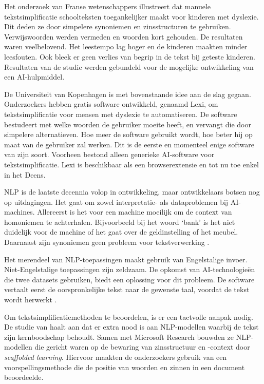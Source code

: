 Het onderzoek van Franse wetenschappers \textcite{Gala2016} illustreert dat manuele tekstsimplificatie schoolteksten toegankelijker maakt voor kinderen met dyslexie. Dit deden ze door simpelere synoniemen en zinsstructuren te gebruiken. Verwijswoorden werden vermeden en woorden kort gehouden. De resultaten waren veelbelovend. Het leestempo lag hoger en de kinderen maakten minder leesfouten. Ook bleek er geen verlies van begrip in de tekst bij geteste kinderen. Resultaten van de studie werden gebundeld voor de mogelijke ontwikkeling van een AI-hulpmiddel.

De Universiteit van Kopenhagen is met bovenstaande idee aan de slag gegaan. Onderzoekers \textcite{Bingel2018} hebben gratis software ontwikkeld, genaamd Lexi, om tekstsimplificatie voor mensen met dyslexie te automatiseren. De software bestudeert met welke woorden de gebruiker moeite heeft, en vervangt die door simpelere alternatieven. Hoe meer de software gebruikt wordt, hoe beter hij op maat van de gebruiker zal werken. Dit is de eerste en momenteel enige software van zijn soort. Voorheen bestond alleen generieke AI-software voor tekstsimplificatie. Lexi is beschikbaar als een browserextensie en tot nu toe enkel in het Deens. 

NLP is de laatste decennia volop in ontwikkeling, maar ontwikkelaars botsen nog op uitdagingen. Het gaat om zowel interpretatie- als dataproblemen bij AI-machines. Allereerst is het voor een machine moeilijk om de context van homoniemen te achterhalen. Bijvoorbeeld bij het woord ‘bank’ is het niet duidelijk voor de machine of het gaat over de geldinstelling of het meubel. Daarnaast zijn synoniemen geen probleem voor tekstverwerking \autocite{Roldos2020}.

Het merendeel van NLP-toepassingen maakt gebruik van Engelstalige invoer. Niet-Engelstalige toepassingen zijn zeldzaam. De opkomst van AI-technologieën die twee datasets gebruiken, biedt een oplossing voor dit probleem. De software vertaalt eerst de oorspronkelijke tekst naar de gewenste taal, voordat de tekst wordt herwerkt \autocite{Sciforce2020}.

Om tekstsimplificatiemethoden te beoordelen, is er een tactvolle aanpak nodig. De studie van \textcite{Swayamdipta2019} haalt aan dat er extra nood is aan NLP-modellen waarbij de tekst zijn kernboodschap behoudt. Samen met Microsoft Research bouwden ze NLP-modellen die gericht waren op de bewaring van zinsstructuur en -context door \emph{scaffolded learning}. Hiervoor maakten de onderzoekers gebruik van een voorspellingsmethode die de positie van woorden en zinnen in een document beoordeelde.


